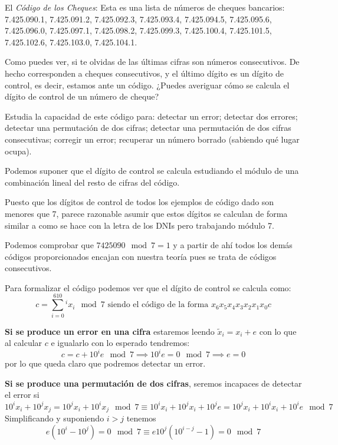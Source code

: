 \begin{problem}[6]  El {\it Código de los Cheques}: Esta es una lista de
números de cheques bancarios: 7.425.090.1, 7.425.091.2,
7.425.092.3, 7.425.093.4, 7.425.094.5, 7.425.095.6, 7.425.096.0,
7.425.097.1, 7.425.098.2, 7.425.099.3, 7.425.100.4, 7.425.101.5,
7.425.102.6,   7.425.103.0,    7.425.104.1.

\ppart Como puedes ver, si te olvidas de las últimas cifras son
números consecutivos. De hecho corresponden a cheques
consecutivos, y el último dígito es un dígito de control, es
decir, estamos ante un código. ¿Puedes averiguar cómo se calcula
el dígito de control de un número de cheque?

\ppart Estudia la capacidad de este código para: detectar un error;
detectar dos errores; detectar una permutación de dos cifras;
detectar una permutación de dos cifras consecutivas; corregir un
error; recuperar un número borrado (sabiendo qué lugar ocupa).
\solution


\spart

Podemos suponer que el dígito de control se calcula estudiando el módulo de una combinación lineal del resto de cifras del código.

Puesto que los dígitos de control de todos los ejemplos de código dado son menores que 7, parece razonable asumir que estos dígitos se calculan de forma similar a como se hace con la letra de los DNIs pero trabajando módulo 7.

Podemos comprobar que $7425090 \mod 7 = 1$ y a partir de ahí todos los demás códigos proporcionados encajan con nuestra teoría pues se trata de códigos consecutivos.

\spart

Para formalizar el código podemos ver que el dígito de control se calcula como:
\[c = \sum_{i=0}^610^ix_i \mod 7 \text{ siendo el código de la forma } x_6x_5x_4x_3x_2x_1x_0c\]

\textbf{Si se produce un error en una cifra} estaremos leendo $\tilde{x}_i = x_i+e$ con lo que al calcular $c$ e igualarlo con lo esperado tendremos:
\[c = c +10^ie \mod 7 \implies 10^ie=0\mod 7 \implies e=0\]
por lo que queda claro que podremos detectar un error.

\textbf{Si se produce una permutación de dos cifras}, seremos incapaces de detectar el error si
\[10^ix_i+10^jx_j = 10^jx_i +10^ix_j \mod 7 \equiv 10^ix_i+10^jx_i+10^je=10^jx_i+10^ix_i+10^ie \mod 7\]
Simplificando y suponiendo $i>j$ tenemos
\[e(10^i-10^j)=0 \mod 7 \equiv e10^j(10^{i-j}-1) = 0 \mod 7\]


\end{problem}
